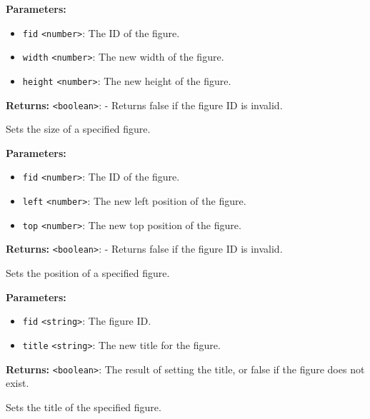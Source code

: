 \documentclass[12pt,a4paper]{article}
\begin{document}
\noindent \textbf{Parameters:}
\begin{itemize}
  \item \texttt{fid} \texttt{<number>}: The ID of the figure.
  \item \texttt{width} \texttt{<number>}: The new width of the figure.
  \item \texttt{height} \texttt{<number>}: The new height of the figure.
\end{itemize}

\noindent \textbf{Returns:} \texttt{<boolean>}: - Returns false if the figure ID is invalid.

\noindent Sets the size of a specified figure.

\vspace{5mm}
\noindent {}


\noindent \textbf{Parameters:}
\begin{itemize}
  \item \texttt{fid} \texttt{<number>}: The ID of the figure.
  \item \texttt{left} \texttt{<number>}: The new left position of the figure.
  \item \texttt{top} \texttt{<number>}: The new top position of the figure.
\end{itemize}

\noindent \textbf{Returns:} \texttt{<boolean>}: - Returns false if the figure ID is invalid.

\noindent Sets the position of a specified figure.

\vspace{5mm}
\noindent {}


\noindent \textbf{Parameters:}
\begin{itemize}
  \item \texttt{fid} \texttt{<string>}: The figure ID.
  \item \texttt{title} \texttt{<string>}: The new title for the figure.
\end{itemize}

\noindent \textbf{Returns:} \texttt{<boolean>}: The result of setting the title, or false if the figure does not exist.

\noindent Sets the title of the specified figure.
\end{document}
